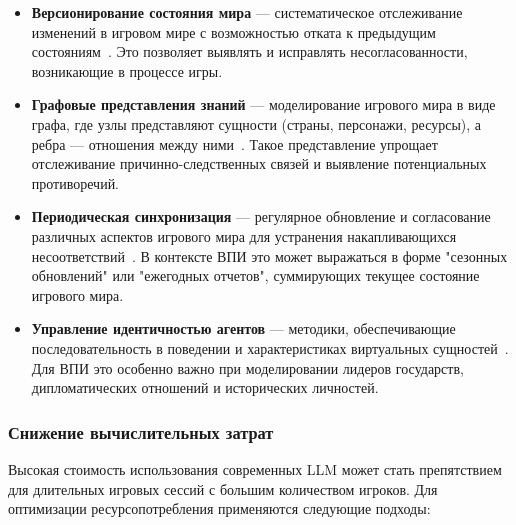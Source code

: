 \begin{itemize}
    \item \textbf{Версионирование состояния мира} — систематическое отслеживание изменений в игровом мире с возможностью отката к предыдущим состояниям~\cite{park2023generative}. Это позволяет выявлять и исправлять несогласованности, возникающие в процессе игры.

    \item \textbf{Графовые представления знаний} — моделирование игрового мира в виде графа, где узлы представляют сущности (страны, персонажи, ресурсы), а ребра — отношения между ними~\cite{ji2023survey}. Такое представление упрощает отслеживание причинно-следственных связей и выявление потенциальных противоречий.

    \item \textbf{Периодическая синхронизация} — регулярное обновление и согласование различных аспектов игрового мира для устранения накапливающихся несоответствий~\cite{zhong2023memgpt}. В контексте ВПИ это может выражаться в форме "{}сезонных обновлений"{} или "{}ежегодных отчетов"{}, суммирующих текущее состояние игрового мира.

    \item \textbf{Управление идентичностью агентов} — методики, обеспечивающие последовательность в поведении и характеристиках виртуальных сущностей~\cite{wang2023rolellm}. Для ВПИ это особенно важно при моделировании лидеров государств, дипломатических отношений и исторических личностей.
\end{itemize}

\subsubsection{Снижение вычислительных затрат}

Высокая стоимость использования современных LLM может стать препятствием для длительных игровых сессий с большим количеством игроков. Для оптимизации ресурсопотребления применяются следующие подходы:

